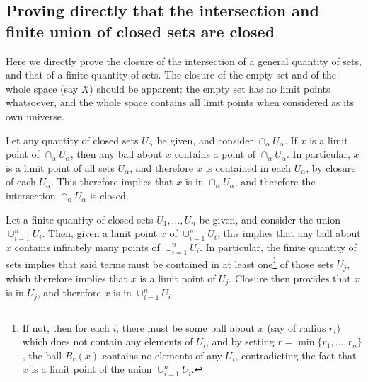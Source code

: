 \begin{appendices}

\section{Proving directly that the intersection and finite union of closed sets are closed}

Here we directly prove the closure of the intersection of a general quantity of sets, and that of a finite quantity of sets. The closure of the empty set and of the whole space (say $X$) should be apparent: the empty set has no limit points whatsoever, and the whole space contains all limit points when considered as its own universe.

Let any quantity of closed sets $U_{\alpha}$ be given, and consider $\cap_{\alpha} U_{\alpha}$. If $x$ is a limit point of $\cap_{\alpha} U_{\alpha}$, then any ball about $x$ contains a point of $\cap_{\alpha} U_{\alpha}$. In particular, $x$ is a limit point of all sets $U_{\alpha}$, and therefore $x$ is contained in each $U_{\alpha}$, by closure of each $U_{\alpha}$. This therefore implies that $x$ is in $\cap_{\alpha} U_{\alpha}$, and therefore the intersection $\cap_{\alpha} U_{\alpha}$ is closed.

Let a finite quantity of closed sets \mbox{$U_{1},\ldots, U_{n}$} be given, and consider the union $\cup_{i=1}^{n} U_{i}$. Then, given a limit point $x$ of $\cup_{i=1}^{n} U_{i}$, this implies that any ball about $x$ contains infinitely many points of $\cup_{i=1}^{n} U_{i}$. In particular, the finite quantity of sets implies that said terms must be contained in at least one\footnote{If not, then for each $i$, there must be some ball about $x$ (say of radius $r_{i}$) which does not contain any elements of $U_{i}$, and by setting \mbox{$r = \min \{r_{1},\ldots, r_{n} \}$}, the ball $B_{r}(x)$ contains no elements of any $U_{i}$, contradicting the fact that $x$ is a limit point of the union \mbox{$\cup_{i=1}^{n} U_{i}$}.} of those sets $U_{j}$, which therefore implies that $x$ is a limit point of $U_{j}$. Closure then provides that $x$ is in $U_{j}$, and therefore $x$ is in $\cup_{i=1}^{n} U_{i}$.


\end{appendices}
